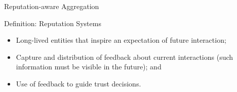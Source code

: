 \begin{frame}{Reputation-aware Aggregation}

  \begin{block}{Definition: Reputation Systems\normalfont~\autocite{resnick_Reputationsystems_2000}}
    \begin{itemize}
      \item Long-lived entities that inspire an expectation of future interaction;
      \item Capture and distribution of feedback about current interactions (such information must be visible in the future); and
      \item Use of feedback to guide trust decisions.
    \end{itemize}
  \end{block}



\end{frame}

